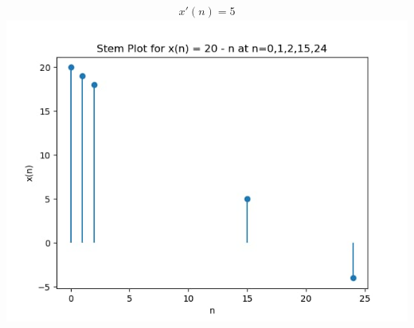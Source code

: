 \documentclass[journal,12pt,twocolumn]{IEEEtran}
\theoremstyle{remark}
\begin{document}
\begin{align}x'(n)=5\end{align}
\includegraphics[width=2\linewidth]{figs/f2.png}\\\\
\end{document}
